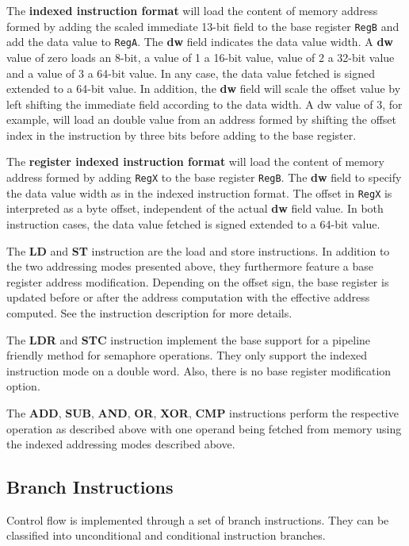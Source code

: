 The \textbf{indexed instruction format} will load the content of memory address formed by adding the scaled immediate 13-bit field to the base register \texttt{RegB} and add the data value to \texttt{RegA}. The \textbf{dw} field indicates the data value width. A \textbf{dw} value of zero loads an 8-bit, a value of 1 a 16-bit value, value of 2 a 32-bit value and a value of 3 a 64-bit value. In any case, the data value fetched is signed extended to a 64-bit value. In addition, the \textbf{dw} field will scale the offset value by left shifting the immediate field according to the data width. A dw value of 3, for example, will load an double value from an address formed by shifting the offset index in the instruction by three bits before adding to the base register.

The \textbf{register indexed instruction format} will load the content of memory address formed by adding \texttt{RegX} to the base register \texttt{RegB}. The \textbf{dw} field to specify the data value width as in the indexed instruction format. The offset in \texttt{RegX} is interpreted as a byte offset, independent of the actual \textbf{dw} field value. In both instruction cases, the data value fetched is signed extended to a 64-bit value. 

The \textbf{LD} and \textbf{ST} instruction are the load and store instructions. In addition to the two addressing modes presented above, they furthermore feature a base register address modification. Depending on the offset sign, the base register is updated before or after the address computation with the effective address computed. See the instruction description for more details.

The \textbf{LDR} and \textbf{STC} instruction implement the base support for a pipeline friendly method for semaphore operations. They only support the indexed instruction mode on a double word. Also, there is no base register modification option.

The \textbf{ADD}, \textbf{SUB}, \textbf{AND}, \textbf{OR}, \textbf{XOR}, \textbf{CMP} instructions perform the respective operation as described above with one operand being fetched from memory using the indexed addressing modes described above.

\subsection*{Branch Instructions}

Control flow is implemented through a set of branch instructions. They can be classified into unconditional and conditional instruction branches.

